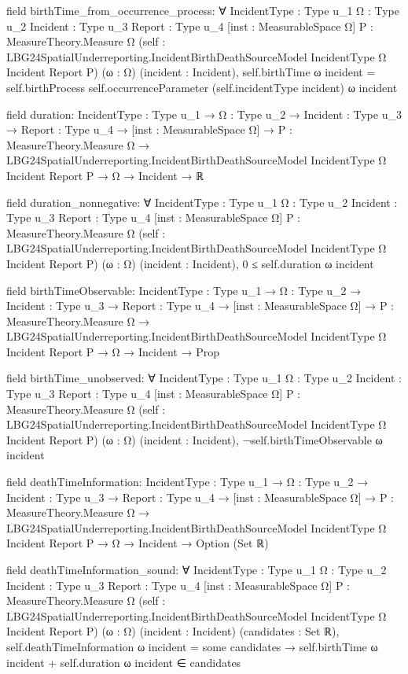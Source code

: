 \documentclass[10pt]{article}
\begin{document}
\begin{ReviewVerbatim}
field birthTime_from_occurrence_process:
∀ {IncidentType : Type u_1} {Ω : Type u_2} {Incident : Type u_3} {Report : Type u_4} [inst : MeasurableSpace Ω]
  {P : MeasureTheory.Measure Ω}
  (self : LBG24SpatialUnderreporting.IncidentBirthDeathSourceModel IncidentType Ω Incident Report P) (ω : Ω)
  (incident : Incident),
  self.birthTime ω incident = self.birthProcess self.occurrenceParameter (self.incidentType incident) ω incident

field duration:
{IncidentType : Type u_1} →
  {Ω : Type u_2} →
    {Incident : Type u_3} →
      {Report : Type u_4} →
        [inst : MeasurableSpace Ω] →
          {P : MeasureTheory.Measure Ω} →
            LBG24SpatialUnderreporting.IncidentBirthDeathSourceModel IncidentType Ω Incident Report P → Ω → Incident → ℝ

field duration_nonnegative:
∀ {IncidentType : Type u_1} {Ω : Type u_2} {Incident : Type u_3} {Report : Type u_4} [inst : MeasurableSpace Ω]
  {P : MeasureTheory.Measure Ω}
  (self : LBG24SpatialUnderreporting.IncidentBirthDeathSourceModel IncidentType Ω Incident Report P) (ω : Ω)
  (incident : Incident), 0 ≤ self.duration ω incident

field birthTimeObservable:
{IncidentType : Type u_1} →
  {Ω : Type u_2} →
    {Incident : Type u_3} →
      {Report : Type u_4} →
        [inst : MeasurableSpace Ω] →
          {P : MeasureTheory.Measure Ω} →
            LBG24SpatialUnderreporting.IncidentBirthDeathSourceModel IncidentType Ω Incident Report P →
              Ω → Incident → Prop

field birthTime_unobserved:
∀ {IncidentType : Type u_1} {Ω : Type u_2} {Incident : Type u_3} {Report : Type u_4} [inst : MeasurableSpace Ω]
  {P : MeasureTheory.Measure Ω}
  (self : LBG24SpatialUnderreporting.IncidentBirthDeathSourceModel IncidentType Ω Incident Report P) (ω : Ω)
  (incident : Incident), ¬self.birthTimeObservable ω incident

field deathTimeInformation:
{IncidentType : Type u_1} →
  {Ω : Type u_2} →
    {Incident : Type u_3} →
      {Report : Type u_4} →
        [inst : MeasurableSpace Ω] →
          {P : MeasureTheory.Measure Ω} →
            LBG24SpatialUnderreporting.IncidentBirthDeathSourceModel IncidentType Ω Incident Report P →
              Ω → Incident → Option (Set ℝ)

field deathTimeInformation_sound:
∀ {IncidentType : Type u_1} {Ω : Type u_2} {Incident : Type u_3} {Report : Type u_4} [inst : MeasurableSpace Ω]
  {P : MeasureTheory.Measure Ω}
  (self : LBG24SpatialUnderreporting.IncidentBirthDeathSourceModel IncidentType Ω Incident Report P) (ω : Ω)
  (incident : Incident) (candidates : Set ℝ),
  self.deathTimeInformation ω incident = some candidates →
    self.birthTime ω incident + self.duration ω incident ∈ candidates


\end{ReviewVerbatim}
\end{document}
